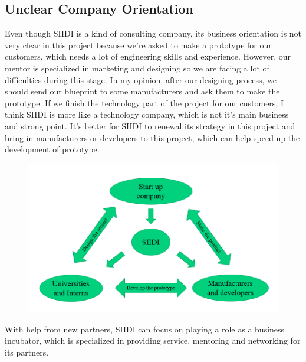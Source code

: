 \documentclass[12pt]{article}
\begin{document}
\subsection{Unclear Company Orientation}
Even though SIIDI is a kind of consulting company, its business orientation is not very clear in this project because we're asked to make a prototype for our customers, which needs a lot of engineering skills and experience. However, our mentor is specialized in marketing and designing so we are facing a lot of difficulties during this stage. In my opinion, after our designing process, we should send our blueprint to some manufacturers and ask them to make the prototype. If we finish the technology part of the project for our customers, I think SIIDI is more like a technology company, which is not it's main business and strong point. It's better for SIIDI to renewal its strategy in this project and bring in manufacturers or developers to this project, which can help speed up the development of prototype.
\begin{figure}[H]
\centering
\includegraphics[scale=0.7]{p3.jpg}
\end{figure}
With help from new partners, SIIDI can focus on playing a role as a business incubator, which is specialized in providing service, mentoring and networking for its partners. 
\end{document}
